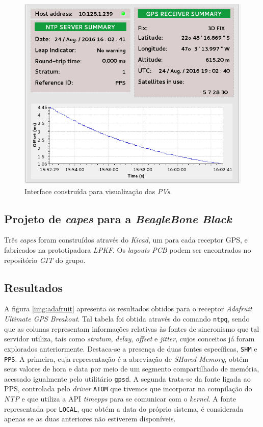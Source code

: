 \begin{figure}[h]
    
    \centering
    \includegraphics[scale=0.35]{image/epics-opi-ntpgps}
    \caption {Interface construída para visualização das
    \textit{PVs}.}
    \label{img:ntp-opi} 
\end{figure} 

 
\subsection{Projeto de \textit{capes} para a \textit{BeagleBone Black}}

Três \textit{capes} foram construídos através do \textit{Kicad}, um para cada
receptor GPS, e fabricados na prototipadora \textit{LPKF}. Os \textit{layouts
PCB} podem ser encontrados no repositório \textit{GIT} do grupo.

\subsection{Resultados}

A figura \ref{img:adafruit} apresenta os resultados obtidos para o receptor
\textit{Adafruit Ultimate GPS Breakout}. Tal tabela foi obtida através do
comando \texttt{ntpq}, sendo que as colunas representam informações relativas às fontes de sincronismo que
tal servidor utiliza, tais como \textit{stratum}, \textit{delay},
\textit{offset} e \textit{jitter}, cujos conceitos já foram explorados
anteriormente. Destaca-se a presença de duas fontes específicas, \texttt{SHM} e
\texttt{PPS}. A primeira, cuja representação é a abreviação de \textit{SHared
Memory}, obtém seus valores de hora e data por meio de um segmento compartilhado de memória,
acessado igualmente pelo utilitário \texttt{gpsd}. A segunda trata-se da fonte
ligada ao PPS, controlada pelo \textit{driver} \texttt{ATOM} que tivemos que
incorporar na compilação do \textit{NTP} e que utiliza a API \textit{timepps}
para se comunicar com o \textit{kernel}. A fonte representada por
\texttt{LOCAL}, que obtém a data do próprio sistema, é considerada apenas se as duas anteriores
não estiverem disponíveis.

